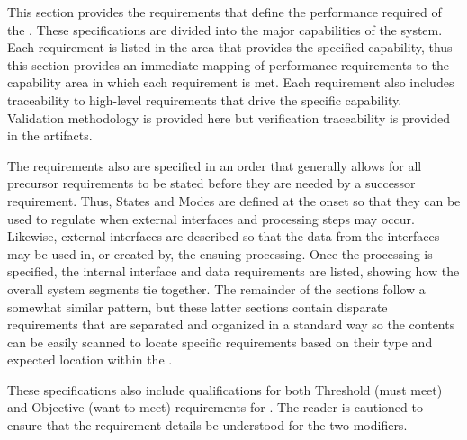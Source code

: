 This section provides the requirements that define the performance required of the \ThisSys.
These specifications are divided into the major capabilities of the system.
Each requirement is listed in the area that provides the specified capability, thus this section provides an immediate mapping of performance requirements to the capability area in which each requirement is met.
Each requirement also includes traceability to high-level requirements that drive the specific capability.
Validation methodology is provided here but verification traceability is provided in the \STS artifacts.


The requirements also are specified in an order that generally allows for all precursor requirements to be stated before they are needed by a successor requirement.
Thus, States and Modes are defined at the onset so that they can be used to regulate when external interfaces and processing steps may occur.
Likewise, external interfaces are described so that the data from the interfaces may be used in, or created by, the ensuing processing.
Once the processing is specified, the internal interface and data requirements are listed, showing how the overall system segments tie together.
The remainder of the sections follow a somewhat similar pattern, but these latter sections contain disparate requirements that are separated and organized in a standard way so the contents can be easily scanned to locate specific requirements based on their type and expected location within the \SPS.

These specifications also include qualifications for both Threshold (must meet) and Objective (want to meet) requirements for \ThisSys.
The reader is cautioned to ensure that the requirement details be understood for the two modifiers.
